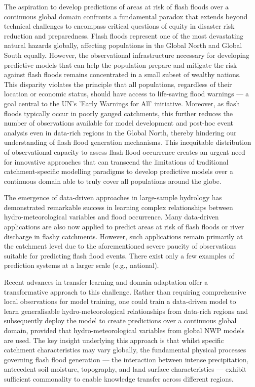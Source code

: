 The aspiration to develop predictions of areas at risk of flash floods over a continuous global domain confronts a fundamental paradox that extends beyond technical challenges to encompass critical questions of equity in disaster risk reduction and preparedness. Flash floods represent one of the most devastating natural hazards globally, affecting populations in the Global North and Global South equally. However, the observational infrastructure necessary for developing predictive models that can help the population prepare and mitigate the risk against flash floods remains concentrated in a small subset of wealthy nations. This disparity violates the principle that all populations, regardless of their location or economic status, should have access to life-saving flood warnings — a goal central to the UN's 'Early Warnings for All' initiative. Moreover, as flash floods typically occur in poorly gauged catchments, this further reduces the number of observations available for model development and post-hoc event analysis even in data-rich regions in the Global North, thereby hindering our understanding of flash flood generation mechanisms. This inequitable distribution of observational capacity to assess flash flood occurrence creates an urgent need for innovative approaches that can transcend the limitations of traditional catchment-specific modelling paradigms to develop predictive models over a continuous domain able to truly cover all populations around the globe.

The emergence of data-driven approaches in large-sample hydrology has demonstrated remarkable success in learning complex relationships between hydro-meteorological variables and flood occurrence. Many data-driven applications are also now applied to predict areas at risk of flash floods or river discharge in flashy catchments. However, such applications remain primarily at the catchment level due to the aforementioned severe paucity of observations suitable for predicting flash flood events. There exist only a few examples of prediction systems at a larger scale (e.g., national).

Recent advances in transfer learning and domain adaptation offer a transformative approach to this challenge. Rather than requiring comprehensive local observations for model training, one could train a data-driven model to learn generalisable hydro-meteorological relationships from data-rich regions and subsequently deploy the model to create predictions over a continuous global domain, provided that hydro-meteorological variables from global NWP models are used. The key insight underlying this approach is that whilst specific catchment characteristics may vary globally, the fundamental physical processes governing flash flood generation — the interaction between intense precipitation, antecedent soil moisture, topography, and land surface characteristics — exhibit sufficient commonality to enable knowledge transfer across different regions.

